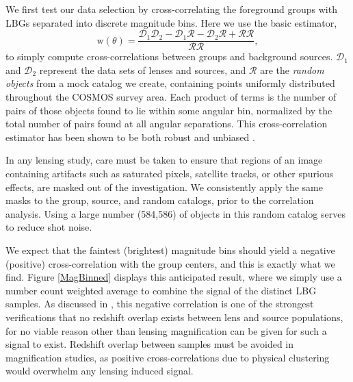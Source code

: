 We first test our data selection by cross-correlating the foreground groups with \ac{LBG}s separated into discrete magnitude bins. Here we use the basic \citet{LandySzalay93} estimator, 
\begin{equation}
\mathrm{w}(\theta)=\frac{\mathscr{D}_1 \mathscr{D}_2 - \mathscr{D}_1 \mathscr{R} - \mathscr{D}_2 \mathscr{R} + \mathscr{R}\mathscr{R}}{\mathscr{R}\mathscr{R}},
\end{equation}
to simply compute cross-correlations between groups and background sources. $\mathscr{D}_1$ and $\mathscr{D}_2$ represent the data sets of lenses and sources, and $\mathscr{R}$ are the {\it random objects} from a mock catalog we create, containing points uniformly distributed throughout the \ac{COSMOS} survey area. Each product of terms is the number of pairs of those objects found to lie within some angular bin, normalized by the total number of pairs found at all angular separations.  This cross-correlation estimator has been shown to be both robust and unbiased \citep{Kerscher00}.  

In any lensing study, care must be taken to ensure that regions of an image containing artifacts such as saturated pixels, satellite tracks, or other spurious effects, are masked out of the investigation.  We consistently apply the same masks to the group, source, and random catalogs, prior to the correlation analysis. Using a large number (584,586) of objects in this random catalog serves to reduce shot noise.  

We expect that the faintest (brightest) magnitude bins should yield a negative (positive) cross-correlation with the group centers, and this is exactly what we find.  Figure \ref{MagBinned} displays this anticipated result, where we simply use a number count weighted average to combine the signal of the distinct \ac{LBG} samples.  As discussed in \citet{Hildebrandt09b}, this negative correlation is one of the strongest verifications that no redshift overlap exists between lens and source populations, for no viable reason other than lensing magnification can be given for such a signal to exist.  Redshift overlap between samples must be avoided in magnification studies, as positive cross-correlations due to physical clustering would overwhelm any lensing induced signal.

